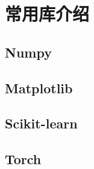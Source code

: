 \section{常用库介绍}

\subsection{Numpy}
\subsection{Matplotlib}
\subsection{Scikit-learn}
\subsection{Torch}
